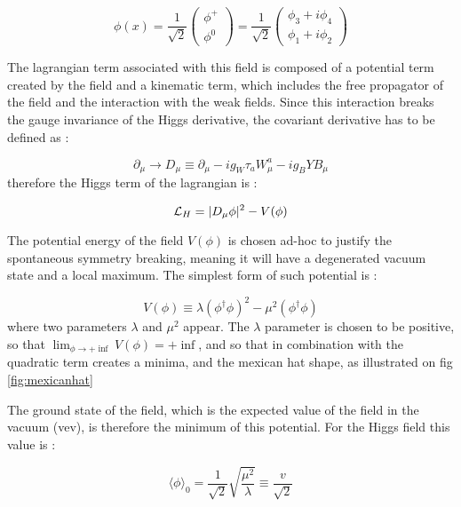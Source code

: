 \begin{equation}
    \phi(x) = \frac{1}{\sqrt{2}} \begin{pmatrix} \phi^+ \\ \phi^0 \end{pmatrix} = \frac{1}{\sqrt{2}} \begin{pmatrix} \phi_3 + i \phi_4 \\ \phi_1 + i \phi_2 \end{pmatrix}
\end{equation}

The lagrangian term associated with this field is composed of a potential term created by the field and a kinematic term, which includes the free propagator of the field and the interaction with the weak fields. Since this interaction breaks the gauge invariance of the Higgs derivative, the covariant derivative has to be defined as :

\begin{equation}
    \partial_{\mu} \rightarrow D_{\mu} \equiv \partial_{\mu} -ig_W \tau_a W_{\mu}^a - ig_B Y B_{\mu}
\end{equation}
therefore the Higgs term of the lagrangian is :

\begin{equation}
    \mathcal{L}_H = | D_{\mu}\phi |^2 - V(\phi)
    \label{eq:higgs_lagr}
\end{equation}

The potential energy of the field $V(\phi)$ is chosen ad-hoc to justify the spontaneous symmetry breaking, meaning it will have a degenerated vacuum state and a local maximum. The simplest form of such potential is :

\begin{equation}
    V(\phi) \equiv \lambda(\phi^{\dagger}\phi)^2 - \mu^2 (\phi^{\dagger}\phi)
\end{equation}
where two parameters $\lambda$ and $\mu^2$ appear. The $\lambda$ parameter is chosen to be positive, so that $\lim_{\phi \to + \inf} V(\phi) = + \inf$, and so that in combination with the quadratic term creates a minima, and the mexican hat shape, as illustrated on fig \ref{fig:mexicanhat}

The ground state of the field, which is the expected value of the field in the vacuum (vev), is therefore the minimum of this potential. For the Higgs field this value is :

\begin{equation}
    \langle \phi \rangle_0 = \frac{1}{\sqrt{2}}\sqrt{\frac{\mu^2}{\lambda}} \equiv \frac{v}{\sqrt{2}}
\end{equation}

